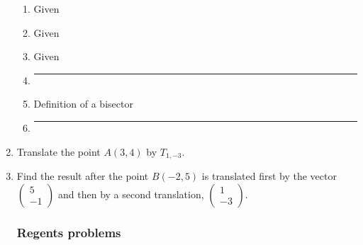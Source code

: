 \documentclass[12pt, twoside]{article}
\begin{document}
\begin{enumerate}
\begin{multicols}{2}
\begin{enumerate}[label={\arabic*)}]
       \end{enumerate}
       \begin{enumerate}[label={\arabic*)}]
         \item Given \vspace{0.3cm}
         \item Given \vspace{0.3cm}
         \item Given \vspace{0.3cm}
         \item \rule{4cm}{0.15mm} \vspace{0.3cm}
         \item Definition of a bisector \vspace{0.3cm}
         \item \rule{4cm}{0.15mm} \vspace{0.3cm}
       \end{enumerate}
     \end{multicols}

  \item Translate the point $A(3,4)$ by $T_{1,-3}$. \vspace{1cm}
  \item Find the result after the point $B(-2,5)$ is translated first by the vector $\left(
         \begin{array}{c}
           5\\
           -1
         \end{array} \right)$
          and then by a second translation,
          $\left( \begin{array}{c}
            1\\
            -3
          \end{array} \right)$.

\newpage
 \subsubsection*{Regents problems}


\end{enumerate}
\end{document}
